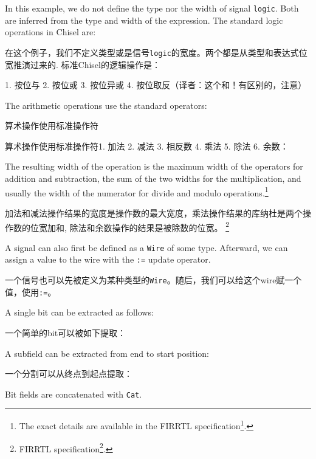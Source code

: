 \documentclass[%
    10pt,
    headinclude, footexclude,
    openright, %
    notitlepage,
    cleardoubleempty,
    headsepline,
    pointlessnumbers,
    bibtotoc, idxtotoc,
    ]{scrbook}
\newcommand{\code}[1]{{\small{\texttt{#1}}}}
\newcommand{\myref}[2]{\href{#1}{#2}}
\renewcommand{\myref}[2]{{#2}{\footnote{\url{#1}}}}
\begin{document}
In this example, we do not define the type nor the width of signal \code{logic}.
Both are inferred from the type and width of the expression.
The standard logic operations in Chisel are:

在这个例子，我们不定义类型或是信号\code{logic}的宽度。两个都是从类型和表达式位宽推演过来的.
标准Chisel的逻辑操作是：



1. 按位与
2. 按位或
3. 按位异或
4. 按位取反（译者：这个和！有区别的，注意）

\noindent The arithmetic operations use the standard operators:

\noindent 算术操作使用标准操作符


算术操作使用标准操作符1. 加法 2. 减法 3. 相反数 4. 乘法 5. 除法 6. 余数：

\noindent The resulting width of the operation is the maximum width of the operators for
addition and subtraction, the sum of the two widths for the multiplication, and usually
the width of the numerator for divide and modulo operations.\footnote{The exact
details are available in the \myref{https://github.com/freechipsproject/firrtl/blob/master/spec/spec.pdf}{FIRRTL specification}.}

加法和减法操作结果的宽度是操作数的最大宽度，乘法操作结果的库纳杜是两个操作数的位宽加和, 除法和余数操作的结果是被除数的位宽。
\footnote{ \myref{https://github.com/freechipsproject/firrtl/blob/master/spec/spec.pdf}{FIRRTL specification}.}

A signal can also first be defined as a \code{Wire} of some type. Afterward, we can assign a
value to the wire with the \code{:=} update operator.

一个信号也可以先被定义为某种类型的\code{Wire}。随后，我们可以给这个wire赋一个值，使用\code{:=}。


A single bit can be extracted as follows:

一个简单的bit可以被如下提取：


\noindent A subfield can be extracted from end to start position:

\noindent 一个分割可以从终点到起点提取：


\noindent Bit fields are concatenated with \code{Cat}.
\end{document}
